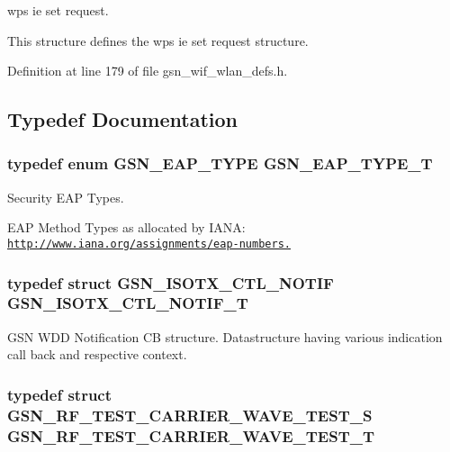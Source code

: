 wps ie set request. 

This structure defines the wps ie set request structure. 

Definition at line 179 of file gsn\_\-wif\_\-wlan\_\-defs.h.



\subsection{Typedef Documentation}
\hypertarget{a00677_ga89d1dbb13f1366a19aef9782b2190e36}{
\subsubsection[{GSN\_\-EAP\_\-TYPE\_\-T}]{\setlength{\rightskip}{0pt plus 5cm}typedef enum {\bf GSN\_\-EAP\_\-TYPE}  {\bf GSN\_\-EAP\_\-TYPE\_\-T}}}
\label{a00677_ga89d1dbb13f1366a19aef9782b2190e36}


Security EAP Types. 

EAP Method Types as allocated by IANA: \href{http://www.iana.org/assignments/eap-numbers.}{\tt http://www.iana.org/assignments/eap-\/numbers.} \hypertarget{a00677_ga26be8d25f388b7b118a0cd750dbdaeb1}{
\subsubsection[{GSN\_\-ISOTX\_\-CTL\_\-NOTIF\_\-T}]{\setlength{\rightskip}{0pt plus 5cm}typedef struct {\bf GSN\_\-ISOTX\_\-CTL\_\-NOTIF} {\bf GSN\_\-ISOTX\_\-CTL\_\-NOTIF\_\-T}}}
\label{a00677_ga26be8d25f388b7b118a0cd750dbdaeb1}


GSN WDD Notification CB structure. Datastructure having various indication call back and respective context. 

\hypertarget{a00677_gae9bb588f7933f628f82d3351844e18f8}{
\subsubsection[{GSN\_\-RF\_\-TEST\_\-CARRIER\_\-WAVE\_\-TEST\_\-T}]{\setlength{\rightskip}{0pt plus 5cm}typedef struct {\bf GSN\_\-RF\_\-TEST\_\-CARRIER\_\-WAVE\_\-TEST\_\-S} {\bf GSN\_\-RF\_\-TEST\_\-CARRIER\_\-WAVE\_\-TEST\_\-T}}}
\label{a00677_gae9bb588f7933f628f82d3351844e18f8}


